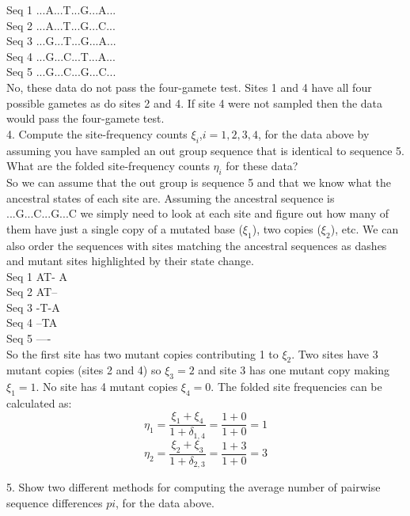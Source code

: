 \documentclass[11pt, oneside]{article}
\begin{document}
\noindent
Seq 1 ...A...T...G...A...\\
Seq 2 ...A...T...G...C...\\
Seq 3 ...G...T...G...A...\\
Seq 4 ...G...C...T...A...\\
Seq 5 ...G...C...G...C...\\

No, these data do not pass the four-gamete test. Sites 1 and 4 have all four possible gametes
as do sites 2 and 4. If site 4 were not sampled then the data would pass the four-gamete test. \\

4. Compute the site-frequency counts $\xi_i$,$i=1,2,3,4$, for the data above by assuming 
you have sampled an out group sequence that is identical to sequence 5. What are the folded 
site-frequency counts $\eta_i$ for these data?\\

So we can assume that the out group is sequence 5 and that we know what the ancestral states 
of each site are. Assuming the ancestral sequence is ...G...C...G...C we simply need to look at each
site and figure out how many of them have just a single copy of a mutated base ($\xi_1$), two copies ($\xi_2$), etc. We can also order the sequences with sites matching the ancestral sequences as dashes 
and mutant sites highlighted by their state change. \\

\noindent
Seq 1 AT- A\\
Seq 2 AT--\\
Seq 3 -T-A\\
Seq 4 --TA\\
Seq 5 ----\\

So the first site has two mutant copies contributing 1 to $\xi_2$. Two sites have 3 mutant copies
(sites 2 and 4) so $\xi_3=2$ and site 3 has one mutant copy making $\xi_1=1$. No site has 4 mutant
copies $\xi_4=0$. The folded site frequencies can be calculated as:\\
\begin{equation*}
\eta_1=\frac{\xi_1+\xi_{4}}{1+\delta_{1,4}}
=\frac{1+0}{1+0}=1
\end{equation*}
\begin{equation*}
\eta_2=\frac{\xi_2+\xi_{3}}{1+\delta_{2,3}}
=\frac{1+3}{1+0}=3
\end{equation*}

5. Show two different methods for computing the average number of pairwise sequence differences 
$pi$, for the data above.\\
\end{document}
